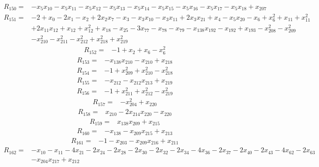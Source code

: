 \begin{align*}
 R_{150}={}&-x_{5}x_{10} -x_{5}x_{11} -x_{5}x_{12} -x_{5}x_{13} -x_{5}x_{14} -x_{5}x_{15} -x_{5}x_{16} -x_{5}x_{17} -x_{5}x_{18} +x_{207}
\end{align*}
\begin{align*}
 R_{151}={}&-2 +x_{0} -2x_{1} -x_{2} +2x_{2}x_{7} -x_{3} -x_{3}x_{10} -x_{3}x_{11} +2x_{3}x_{21} +x_{4} -x_{5}x_{20} -x_{6} +x_{6}^{2} +x_{11} +x_{11}^{2}\\
 &+2x_{11}x_{12} +x_{12} +x_{12}^{2} +x_{18} -x_{25} -3x_{77} -x_{78} -x_{79} -x_{138}x_{192} -x_{192} +x_{193} -x_{208}^{2} -x_{209}^{2}\\
 &-x_{210}^{2} -x_{211}^{2} -x_{212}^{2} +x_{218}^{2} +x_{219}^{2}
\end{align*}
\begin{align*}
 R_{152}={}&-1 +x_{2} +x_{6} -x_{6}^{2}
\end{align*}
\begin{align*}
 R_{153}={}&-x_{138}x_{210} -x_{210} +x_{218}
\end{align*}
\begin{align*}
 R_{154}={}&-1 +x_{209}^{2} +x_{210}^{2} -x_{218}^{2}
\end{align*}
\begin{align*}
 R_{155}={}&-x_{212} -x_{212}x_{213} +x_{219}
\end{align*}
\begin{align*}
 R_{156}={}&-1 +x_{211}^{2} +x_{212}^{2} -x_{219}^{2}
\end{align*}
\begin{align*}
 R_{157}={}&-x_{204}^{2} +x_{220}
\end{align*}
\begin{align*}
 R_{158}={}&x_{210} -2x_{214}x_{220} -x_{220}
\end{align*}
\begin{align*}
 R_{159}={}&x_{138}x_{209} +x_{215}
\end{align*}
\begin{align*}
 R_{160}={}&-x_{138} -x_{209}x_{215} +x_{213}
\end{align*}
\begin{align*}
 R_{161}={}&-1 -x_{203} -x_{209}x_{216} +x_{211}
\end{align*}
\begin{align*}
 R_{162}={}&-x_{10} -x_{11} -4x_{21} -2x_{24} -2x_{28} -2x_{30} -2x_{32} -2x_{34} -4x_{36} -2x_{37} -2x_{40} -2x_{43} -4x_{62} -2x_{63}\\
 &-x_{204}x_{217} +x_{212}
\end{align*}
